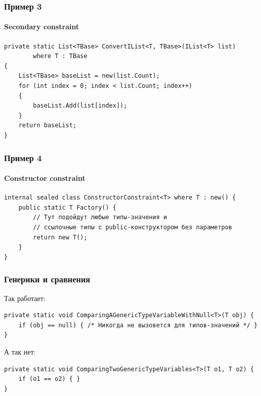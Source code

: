 \documentclass{../../slides-style}
\begin{document}
    \begin{frame}[fragile]
        \frametitle{Пример 3}
        \framesubtitle{Secondary constraint}
        \begin{footnotesize}
            \begin{verbatim}
private static List<TBase> ConvertIList<T, TBase>(IList<T> list)
        where T : TBase 
{
    List<TBase> baseList = new(list.Count);
    for (int index = 0; index < list.Count; index++) 
    {
        baseList.Add(list[index]);
    }
    return baseList;
}
            \end{verbatim}
        \end{footnotesize}
    \end{frame}

    \begin{frame}[fragile]
        \frametitle{Пример 4}
        \framesubtitle{Constructor constraint}
        \begin{footnotesize}
            \begin{verbatim}
internal sealed class ConstructorConstraint<T> where T : new() {
    public static T Factory() {
        // Тут подойдут любые типы-значения и 
        // ссылочные типы с public-конструктором без параметров
        return new T();
    }
}
            \end{verbatim}
        \end{footnotesize}
    \end{frame}

    \begin{frame}[fragile]
        \frametitle{Генерики и сравнения}
        Так работает:
        \begin{footnotesize}
            \begin{verbatim}
private static void ComparingAGenericTypeVariableWithNull<T>(T obj) {
    if (obj == null) { /* Никогда не вызовется для типов-значений */ }
}
            \end{verbatim}
        \end{footnotesize}
        \vspace{5mm}
        А так нет:
        \begin{footnotesize}
            \begin{verbatim}
private static void ComparingTwoGenericTypeVariables<T>(T o1, T o2) {
    if (o1 == o2) { }
}
            \end{verbatim}
        \end{footnotesize}
    \end{frame}
\end{document}
